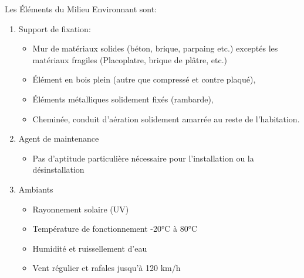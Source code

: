 Les Éléments du Milieu Environnant sont:

\begin{enumerate}
 \item Support de fixation:
 \begin{itemize}
  \item Mur de matériaux solides (béton, brique, parpaing etc.) exceptés les matériaux fragiles (Placoplatre, brique de plâtre, etc.)
  \item Élément en bois plein (autre que compressé et contre plaqué),
  \item Éléments métalliques solidement fixés (rambarde),
  \item Cheminée, conduit d'aération solidement amarrée au reste de l'habitation.
 \end{itemize}
 \item Agent de maintenance
 \begin{itemize}
  \item Pas d'aptitude particulière nécessaire pour l'installation ou la désinstallation
 \end{itemize}
 \item Ambiants
 \begin{itemize}
  \item Rayonnement solaire (UV)
  \item Température de fonctionnement -20°C à 80°C
  \item Humidité et ruissellement d'eau	
  \item Vent régulier et rafales jusqu'à 120 km/h
 \end{itemize}
 \end{enumerate}
 
